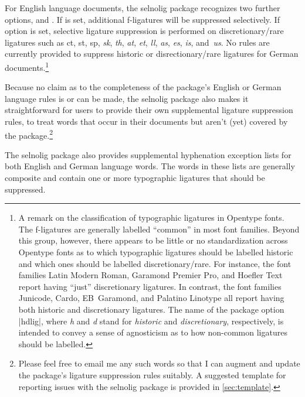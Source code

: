 \documentclass[11pt]{article}
\newcommand{\pkg}[1]{\textsf{#1}}
\newcommand{\opt}[1]{\uselig{\texttt{#1}}}
\begin{document}

For English language documents, the \pkg{selnolig} package recognizes two further options, \opt{broadf} and \opt{hdlig}. If \opt{broadf} is set, additional f-ligatures will be suppressed selectively. If \opt{hdlig} option is set, selective ligature suppression is performed on discretionary\slash rare ligatures such as ct, st, sp, {\ebg\emph{sk}}, \emph{th}, \emph{at}, \emph{et}, \emph{ll}, \emph{as}, \emph{\ebg es}, \emph{is}, and~\emph{us}. No rules are currently provided to suppress historic or disrectionary\slash rare ligatures for German documents.\footnote{A remark on the classification of typographic ligatures in Opentype fonts.  The f-ligatures are generally labelled \enquote{common} in most font families. Beyond this group, however, there appears to be little or no standardization across Opentype fonts as to which typographic ligatures should be labelled historic and which ones should be labelled discretionary\slash rare. For instance, the font families Latin Modern Roman, Garamond Premier Pro, and Hoefler Text report having \enquote{just} discretionary ligatures. In contrast, the font families Junicode, Cardo, EB~Garamond, and Palatino Linotype all report having both historic and discretionary ligatures. The name of the package option |hdlig|, where \emph{h} and \emph{d} stand for \emph{historic} and \emph{discretionary}, respectively, is intended to convey a sense of agnosticism as to how non-common ligatures should be labelled.}

Because no claim as to the completeness of the package's English or German language rules is or can be made, the \pkg{selnolig} package also makes it straightforward for users to provide their own supplemental ligature suppression rules, to treat words that occur in their documents but aren't (yet) covered by the package.\footnote{Please feel free to email me any such words so that I can augment and update the package's ligature suppression rules suitably. A suggested template for reporting issues with the \pkg{selnolig} package is provided in \cref{sec:template}.}

The \pkg{selnolig} package also provides supplemental hyphenation exception lists for both English and German language words. The words in these lists are generally composite and contain one or more typographic ligatures that should be suppressed.
\end{document}
